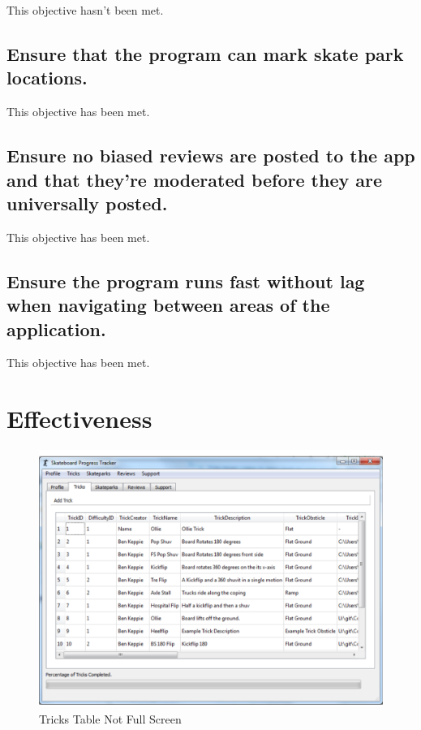 \begin{itemize}
This objective hasn't been met.

\subsection {Ensure that the program can mark skate park locations.}

This objective has been met.


\subsection {Ensure no biased reviews are posted to the app and that they're moderated before they are universally posted.}

This objective has been met.

\subsection {Ensure the program runs fast without lag when navigating between areas of the application.}  %

This objective has been met.



\section{Effectiveness}

\begin{figure}[H]
    \includegraphics[width=\textwidth]{./Evaluation/images/TricksTableNFS.pdf}
    \caption{Tricks Table Not Full Screen} \label{fig:TricksTableNFS}
\end{figure}


\end{itemize}
